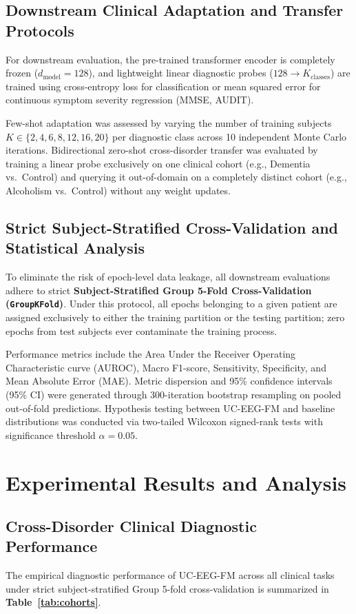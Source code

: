 \documentclass[11pt,a4paper]{article}
\begin{document}
\subsection{Downstream Clinical Adaptation and Transfer Protocols}
For downstream evaluation, the pre-trained transformer encoder is completely frozen ($d_{\text{model}} = 128$), and lightweight linear diagnostic probes ($128 \to K_{\text{classes}}$) are trained using cross-entropy loss for classification or mean squared error for continuous symptom severity regression (MMSE, AUDIT).

Few-shot adaptation was assessed by varying the number of training subjects $K \in \{2, 4, 6, 8, 12, 16, 20\}$ per diagnostic class across 10 independent Monte Carlo iterations. Bidirectional zero-shot cross-disorder transfer was evaluated by training a linear probe exclusively on one clinical cohort (e.g., Dementia vs.\ Control) and querying it out-of-domain on a completely distinct cohort (e.g., Alcoholism vs.\ Control) without any weight updates.

\subsection{Strict Subject-Stratified Cross-Validation and Statistical Analysis}
To eliminate the risk of epoch-level data leakage, all downstream evaluations adhere to strict \textbf{Subject-Stratified Group 5-Fold Cross-Validation (\texttt{GroupKFold})}. Under this protocol, all epochs belonging to a given patient are assigned exclusively to either the training partition or the testing partition; zero epochs from test subjects ever contaminate the training process.

Performance metrics include the Area Under the Receiver Operating Characteristic curve (AUROC), Macro F1-score, Sensitivity, Specificity, and Mean Absolute Error (MAE). Metric dispersion and 95\% confidence intervals (95\% CI) were generated through 300-iteration bootstrap resampling on pooled out-of-fold predictions. Hypothesis testing between UC-EEG-FM and baseline distributions was conducted via two-tailed Wilcoxon signed-rank tests with significance threshold $\alpha = 0.05$.

\section{Experimental Results and Analysis}
\label{sec:results}

\subsection{Cross-Disorder Clinical Diagnostic Performance}
The empirical diagnostic performance of UC-EEG-FM across all clinical tasks under strict subject-stratified Group 5-fold cross-validation is summarized in \textbf{Table~\ref{tab:cohorts}}.
\end{document}
